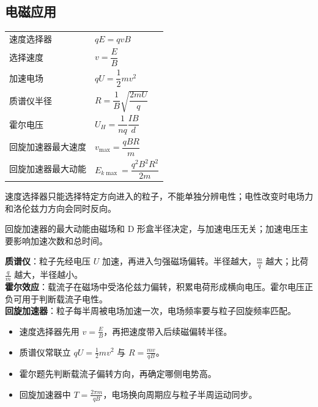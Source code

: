
\subsection{电磁应用}

\begin{tabularx}{\columnwidth}{XX}
  速度选择器&$qE=qvB$\\
  选择速度&$v=\dfrac{E}{B}$\\
  加速电场&$qU=\dfrac12mv^2$\\
  质谱仪半径&$R=\dfrac1B\sqrt{\dfrac{2mU}{q}}$\\
  霍尔电压&$U_H=\dfrac1{nq}\dfrac{IB}{d}$\\
  回旋加速器最大速度&$v_{\max}=\dfrac{qBR}{m}$\\
  回旋加速器最大动能&$E_{k\max}=\dfrac{q^2B^2R^2}{2m}$\\
\end{tabularx}

\begin{formulanotebox}
速度选择器只能选择特定方向进入的粒子，不能单独分辨电性；电性改变时电场力和洛伦兹力方向会同时反向。

回旋加速器的最大动能由磁场和 D 形盒半径决定，与加速电压无关；加速电压主要影响加速次数和总时间。
\end{formulanotebox}

\begin{keypointbox}[title={\strut\textcolor{white}{\bfseries 重点知识点：电磁应用}}]
\textbf{质谱仪}：粒子先经电压 $U$ 加速，再进入匀强磁场偏转。半径越大，$\frac{m}{q}$ 越大；比荷 $\frac{q}{m}$ 越大，半径越小。\\

\textbf{霍尔效应}：载流子在磁场中受洛伦兹力偏转，积累电荷形成横向电压。霍尔电压正负可用于判断载流子电性。\\

\textbf{回旋加速器}：粒子每半周被电场加速一次，电场频率要与粒子回旋频率匹配。
\end{keypointbox}

\begin{casetypebox}[title={\strut\textcolor{white}{\bfseries 常见题型：电磁组合装置}}]
\begin{itemize}[leftmargin=1.5em]
  \item 速度选择器先用 $v=\frac{E}{B}$，再把速度带入后续磁偏转半径。
  \item 质谱仪常联立 $qU=\frac12mv^2$ 与 $R=\frac{mv}{qB}$。
  \item 霍尔题先判断载流子偏转方向，再确定哪侧电势高。
  \item 回旋加速器中 $T=\frac{2\pi m}{qB}$，电场换向周期应与粒子半周运动同步。
\end{itemize}
\end{casetypebox}
